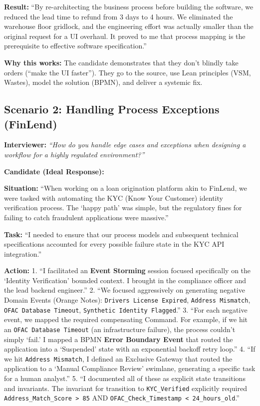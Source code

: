 \documentclass[
  11pt,
  openany,
  oneside]{book}
\renewenvironment{quote}{\begin{customquote}}{\end{customquote}}
\begin{document}
\textbf{Result:} ``By re-architecting the business process before
building the software, we reduced the lead time to refund from 3 days to
4 hours. We eliminated the warehouse floor gridlock, and the engineering
effort was actually smaller than the original request for a UI overhaul.
It proved to me that process mapping is the prerequisite to effective
software specification.''

\begin{quote}
\textbf{Why this works:} The candidate demonstrates that they don't
blindly take orders (``make the UI faster''). They go to the source, use
Lean principles (VSM, Wastes), model the solution (BPMN), and deliver a
systemic fix.
\end{quote}

\subsection{Scenario 2: Handling Process Exceptions
(FinLend)}\label{scenario-2-handling-process-exceptions-finlend}

\textbf{Interviewer:} \emph{``How do you handle edge cases and
exceptions when designing a workflow for a highly regulated
environment?''}

\textbf{Candidate (Ideal Response):}

\textbf{Situation:} ``When working on a loan origination platform akin
to FinLend, we were tasked with automating the KYC (Know Your Customer)
identity verification process. The `happy path' was simple, but the
regulatory fines for failing to catch fraudulent applications were
massive.''

\textbf{Task:} ``I needed to ensure that our process models and
subsequent technical specifications accounted for every possible failure
state in the KYC API integration.''

\textbf{Action:} 1. ``I facilitated an \textbf{Event Storming} session
focused specifically on the `Identity Verification' bounded context. I
brought in the compliance officer and the lead backend engineer.'' 2.
``We focused aggressively on generating negative Domain Events (Orange
Notes): \texttt{Driver\textquotesingle{}s\ License\ Expired},
\texttt{Address\ Mismatch}, \texttt{OFAC\ Database\ Timeout},
\texttt{Synthetic\ Identity\ Flagged}.'' 3. ``For each negative event,
we mapped the required compensating Command. For example, if we hit an
\texttt{OFAC\ Database\ Timeout} (an infrastructure failure), the
process couldn't simply `fail.' I mapped a BPMN \textbf{Error Boundary
Event} that routed the application into a `Suspended' state with an
exponential backoff retry loop.'' 4. ``If we hit
\texttt{Address\ Mismatch}, I defined an Exclusive Gateway that routed
the application to a `Manual Compliance Review' swimlane, generating a
specific task for a human analyst.'' 5. ``I documented all of these as
explicit state transitions and invariants. The invariant for transition
to \texttt{KYC\_Verified} explicitly required
\texttt{Address\_Match\_Score\ \textgreater{}\ 85} AND
\texttt{OFAC\_Check\_Timestamp\ \textless{}\ 24\_hours\_old}.''
\end{document}

